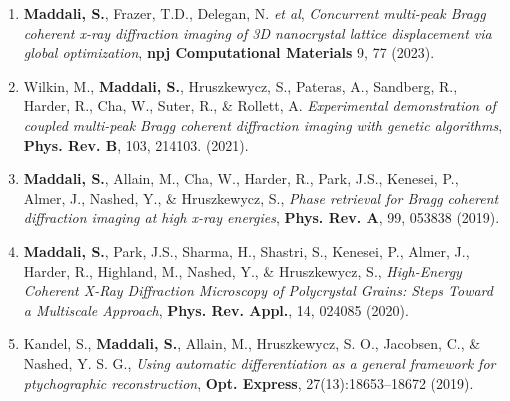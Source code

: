 \begin{enumerate}
    \item \textbf{Maddali, S.}, Frazer, T.D., Delegan, N. \emph{et al}, \emph{Concurrent multi-peak Bragg coherent x-ray diffraction imaging of 3D nanocrystal lattice displacement via global optimization}, \textbf{npj Computational Materials} 9, 77 (2023).
    \item Wilkin, M., \textbf{Maddali, S.}, Hruszkewycz, S., Pateras, A., Sandberg, R., Harder, R., Cha, W., Suter, R., \& Rollett, A. \emph{Experimental demonstration of coupled multi-peak Bragg coherent diffraction imaging with genetic algorithms}, \textbf{Phys. Rev. B}, 103, 214103. (2021).
    \item \textbf{Maddali, S.}, Allain, M., Cha, W., Harder, R., Park, J.S., Kenesei, P., Almer, J., Nashed, Y., \& Hruszkewycz, S., \emph{Phase retrieval for Bragg coherent diffraction imaging at high x-ray energies}, \textbf{Phys. Rev. A}, 99, 053838 (2019).
    \item \textbf{Maddali, S.}, Park, J.S., Sharma, H., Shastri, S., Kenesei, P., Almer, J., Harder, R., Highland, M., Nashed, Y., \& Hruszkewycz, S., \emph{High-Energy Coherent X-Ray Diffraction Microscopy of Polycrystal Grains: Steps Toward a Multiscale Approach}, \textbf{Phys. Rev. Appl.}, 14, 024085 (2020).
    \item Kandel, S., \textbf{Maddali, S.}, Allain, M., Hruszkewycz, S. O., Jacobsen, C., \& Nashed, Y. S. G., \emph{Using automatic differentiation as a general framework for ptychographic reconstruction}, \textbf{Opt. Express}, 27(13):18653–18672 (2019).

\end{enumerate}
